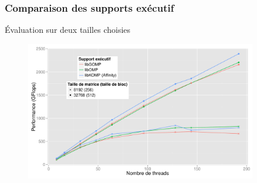 \documentclass[xcolor={usenames,dvipsnames,svgnames,table}, aspectratio=43]{beamer}
\begin{document}
\begin{frame}
  \frametitle{Comparaison des supports exécutif}
  Évaluation sur deux tailles choisies
  \begin{figure}
    \centering
    \includegraphics[width=0.9\textwidth]{graph/graph_all_cholesky_idchire.pdf}
  \end{figure}
\end{frame}
\end{document}
